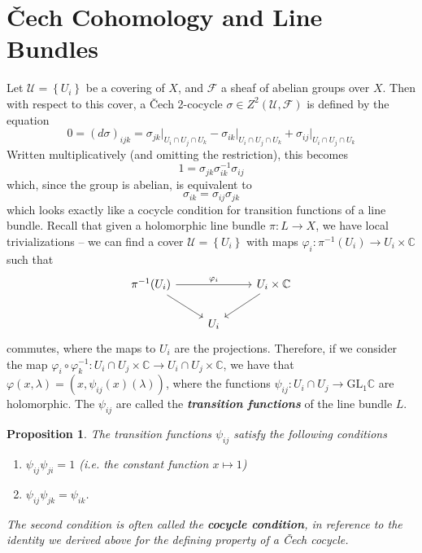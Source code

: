 \documentclass[psamsfonts, 12pt]{amsart}
\newtheorem{prop}[thm]{Proposition}
\theoremstyle{definition}
\theoremstyle{remark}
\newcommand{\ib}[1]{\textbf{\textit{#1}}}
\renewcommand{\C}{\mathbb{C}}
\newcommand{\GL}{\mathrm{GL}}
\newcommand{\inv}{^{-1}}
\newcommand{\set}[1]{\left\lbrace #1 \right\rbrace}
\begin{document}
\section{\v{C}ech Cohomology and Line Bundles}
%
Let $\mathcal{U} = \set{U_i}$ be a covering of $X$, and $\mathcal{F}$ a sheaf
of abelian groups over $X$. Then with respect to this cover, a \v{C}ech 2-cocycle
$\sigma \in Z^2(\mathcal{U}, \mathcal{F})$ is defined by the equation
\[
0 = (d\sigma)_{ijk} = \sigma_{jk}\vert_{U_i \cap U_j \cap U_k}
- \sigma_{ik}\vert_{U_i \cap U_j \cap U_k} + \sigma_{ij}\vert_{U_i \cap U_j \cap U_k}
\]
Written multiplicatively (and omitting the restriction), this becomes
\[
1 = \sigma_{jk}\sigma_{ik}\inv\sigma_{ij}
\]
which, since the group is abelian, is equivalent to
\[
\sigma_{ik} = \sigma_{ij}\sigma_{jk}
\]
which looks exactly like a cocycle condition for transition functions of a line
bundle. Recall that given a holomorphic line bundle $\pi : L \to X$, we have local
trivializations -- we can find a cover $\mathcal{U} = \set{U_i}$ with maps
$\varphi_i : \pi\inv(U_i) \to U_i \times \C$ such that
\[\begin{tikzcd}
\pi\inv(U_i) \ar[rr, "\varphi_i"] \ar[dr] & & U_i \times \C \ar[dl] \\
& U_i
\end{tikzcd}\]
commutes, where the maps to $U_i$ are the projections. Therefore, if we consider
the map
$\varphi_i \circ \varphi_k\inv : U_i \cap U_j \times \C \to U_i \cap U_j \times \C$,
we have that $\varphi(x, \lambda) = (x, \psi_{ij}(x)(\lambda))$, where the functions
$\psi_{ij} : U_i\cap U_j \to \GL_1\C$ are holomorphic. The $\psi_{ij}$
are called the \ib{transition functions} of the line bundle $L$.
%
\begin{prop}
The transition functions $\psi_{ij}$ satisfy the following conditions
\begin{enumerate}
  \item $\psi_{ij}\psi_{ji} = 1$ (i.e. the constant function $x \mapsto 1$)
  \item $\psi_{ij}\psi_{jk} = \psi_{ik}$.
\end{enumerate}
The second condition is often called the \ib{cocycle condition}, in reference to the
identity we derived above for the defining property of a \v{C}ech cocycle.
\end{prop}
%
\end{document}
